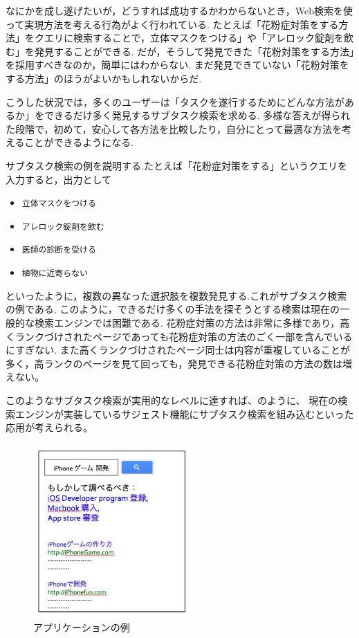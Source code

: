 \documentclass[submit,techreq]{ipsj}
\def\|{\verb|}
\begin{document}
なにかを成し遂げたいが，どうすれば成功するかわからないとき，Web検索を使って実現方法を考える行為がよく行われている. たとえば「花粉症対策をする方法」をクエリに検索することで，立体マスクをつける」や「アレロック錠剤を飲む」を発見することができる. だが，そうして発見できた「花粉対策をする方法」を採用すべきなのか，簡単にはわからない. まだ発見できていない「花粉対策をする方法」のほうがよいかもしれないからだ.


こうした状況では，多くのユーザーは「タスクを遂行するためにどんな方法があるか」をできるだけ多く発見するサブタスク検索を求める. 多様な答えが得られた段階で，初めて，安心して各方法を比較したり，自分にとって最適な方法を考えることができるようになる.

サブタスク検索の例を説明する.たとえば「花粉症対策をする」というクエリを入力すると，出力として


\begin{itemize}
\item \|立体マスクをつける|
\item \|アレロック錠剤を飲む|
\item \|医師の診断を受ける|
\item \|植物に近寄らない|
\end{itemize}


といったように，複数の異なった選択肢を複数発見する.これがサブタスク検索の例である. このように，できるだけ多くの手法を探そうとする検索は現在の一般的な検索エンジンでは困難である. 花粉症対策の方法は非常に多様であり，高くランクづけされたページであっても花粉症対策の方法のごく一部を含んでいるにすぎない. また高くランクづけされたページ同士は内容が重複していることが多く，高ランクのページを見て回っても，発見できる花粉症対策の方法の数は増えない。

このようなサブタスク検索が実用的なレベルに達すれば、のように、 現在の検索エンジンが実装しているサジェスト機能にサブタスク検索を組み込むといった応用が考えられる。

\begin{figure}[tb]
\includegraphics[width=6cm, bb=0 0 250 419]{future_app.jpg}
\caption{アプリケーションの例}
\label{fig:future_app}
\end{figure}
\end{document}
